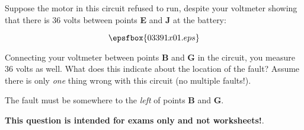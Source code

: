 

Suppose the motor in this circuit refused to run, despite your voltmeter showing that there is 36 volts between points {\bf E} and {\bf J} at the battery:

$$\epsfbox{03391x01.eps}$$

Connecting your voltmeter between points {\bf B} and {\bf G} in the circuit, you measure 36 volts as well.  What does this indicate about the location of the fault?  Assume there is only {\it one} thing wrong with this circuit (no multiple faults!).







The fault must be somewhere to the {\it left} of points {\bf B} and {\bf G}.







{\bf This question is intended for exams only and not worksheets!}.



